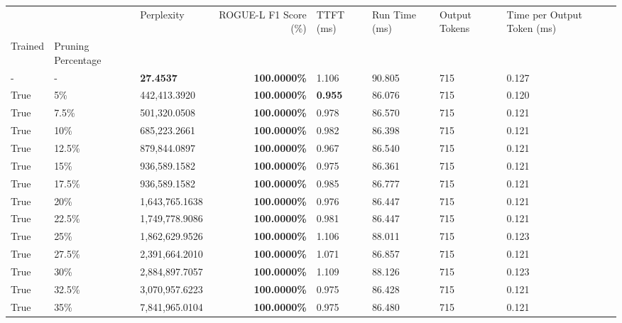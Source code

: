 \begin{table}[H]
\label{tab:evaluation-pipeline-2-trained}
\begin{tabular}{lllrllll}
\toprule
 &  & Perplexity & ROGUE-L F1 Score (\%) & TTFT (ms) & Run Time (ms) & Output Tokens & Time per Output Token (ms) \\
Trained & Pruning Percentage &  &  &  &  &  &  \\
\midrule
- & - & \bfseries 27.4537 & \bfseries 100.0000\% & 1.106 & 90.805 & 715 & 0.127 \\
\cline{1-8} \cline{2-8}
True & 5\% & 442,413.3920 & \bfseries \color{red} 100.0000\% & \bfseries \color{red} 0.955 & 86.076 & 715 & 0.120 \\
\cline{1-8} \cline{2-8}
True & 7.5\% & 501,320.0508 & \bfseries \color{red} 100.0000\% & 0.978 & 86.570 & 715 & 0.121 \\
\cline{1-8} \cline{2-8}
True & 10\% & 685,223.2661 & \bfseries \color{red} 100.0000\% & 0.982 & 86.398 & 715 & 0.121 \\
\cline{1-8} \cline{2-8}
True & 12.5\% & 879,844.0897 & \bfseries \color{red} 100.0000\% & 0.967 & 86.540 & 715 & 0.121 \\
\cline{1-8} \cline{2-8}
True & 15\% & 936,589.1582 & \bfseries \color{red} 100.0000\% & 0.975 & 86.361 & 715 & 0.121 \\
\cline{1-8} \cline{2-8}
True & 17.5\% & 936,589.1582 & \bfseries \color{red} 100.0000\% & 0.985 & 86.777 & 715 & 0.121 \\
\cline{1-8} \cline{2-8}
True & 20\% & 1,643,765.1638 & \bfseries \color{red} 100.0000\% & 0.976 & 86.447 & 715 & 0.121 \\
\cline{1-8} \cline{2-8}
True & 22.5\% & 1,749,778.9086 & \bfseries \color{red} 100.0000\% & 0.981 & 86.447 & 715 & 0.121 \\
\cline{1-8} \cline{2-8}
True & 25\% & 1,862,629.9526 & \bfseries \color{red} 100.0000\% & 1.106 & 88.011 & 715 & 0.123 \\
\cline{1-8} \cline{2-8}
True & 27.5\% & 2,391,664.2010 & \bfseries \color{red} 100.0000\% & 1.071 & 86.857 & 715 & 0.121 \\
\cline{1-8} \cline{2-8}
True & 30\% & 2,884,897.7057 & \bfseries \color{red} 100.0000\% & 1.109 & 88.126 & 715 & 0.123 \\
\cline{1-8} \cline{2-8}
True & 32.5\% & 3,070,957.6223 & \bfseries \color{red} 100.0000\% & 0.975 & 86.428 & 715 & 0.121 \\
\cline{1-8} \cline{2-8}
True & 35\% & 7,841,965.0104 & \bfseries \color{red} 100.0000\% & 0.975 & 86.480 & 715 & 0.121 \\

\end{tabular}
\end{table}
